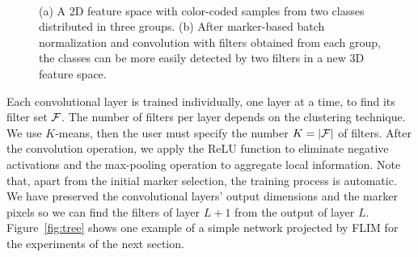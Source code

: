 \documentclass[a4paper,conference]{IEEEtran}
\begin{document}
\begin{figure}[!ht]
  \centering
  ~
  \caption{(a) A 2D feature space with color-coded samples from two classes distributed in three groups. (b) After marker-based batch normalization and convolution with filters obtained from each group, the classes can be more easily detected by two filters in a new 3D feature space.}
  \label{fig:filter}
\end{figure}

Each convolutional layer is trained individually, one layer at a time, to find its filter set ${\cal F}$. The number of filters per layer depends on the clustering technique. We use $K$-means, then the user must specify the number $K=|{\cal F}|$ of filters. After the convolution operation, we apply the ReLU function to eliminate negative activations and the max-pooling operation to aggregate local information. Note that, apart from the initial marker selection, the training process is automatic. We have preserved the convolutional layers' output dimensions and the marker pixels so we can find the filters of layer $L+1$ from the output of layer $L$. Figure~\ref{fig:tree} shows one example of a simple network projected by FLIM for the experiments of the next section. 
\end{document}
